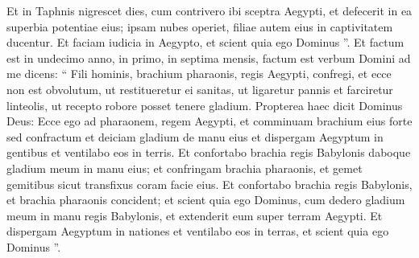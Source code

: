\begin{biblechapter}
\begin{biblechapter}
\begin{biblechapter}
\begin{biblechapter}
\begin{biblechapter}
\begin{biblechapter}
\begin{biblechapter}
\begin{biblechapter}
\begin{biblechapter}
\begin{biblechapter}
\begin{biblechapter}
\begin{biblechapter}
\begin{biblechapter}
\begin{biblechapter}
\begin{biblechapter}
\begin{biblechapter}
\begin{biblechapter}
\begin{biblechapter}
\begin{biblechapter}
\begin{biblechapter}
\begin{biblechapter}
\begin{biblechapter}
\begin{biblechapter}
\begin{biblechapter}
\begin{biblechapter}
\begin{biblechapter}
\begin{biblechapter}
\begin{biblechapter}
\begin{biblechapter}
\begin{biblechapter}
\verse Et in Taphnis nigrescet dies, cum contrivero ibi sceptra Aegypti, et defecerit in ea superbia potentiae eius; ipsam nubes operiet, filiae autem eius in captivitatem ducentur. 
\verse Et faciam iudicia in Aegypto, et scient quia ego Dominus ”.
 \verse Et factum est in undecimo anno, in primo, in septima mensis, factum est verbum Domini ad me dicens: 
\verse “ Fili hominis, brachium pharaonis, regis Aegypti, confregi, et ecce non est obvolutum, ut restitueretur ei sanitas, ut ligaretur pannis et farciretur linteolis, ut recepto robore posset tenere gladium. 
\verse Propterea haec dicit Dominus Deus: Ecce ego ad pharaonem, regem Aegypti, et comminuam brachium eius forte sed confractum et deiciam gladium de manu eius 
\verse et dispergam Aegyptum in gentibus et ventilabo eos in terris. 
 \verse Et confortabo brachia regis Babylonis daboque gladium meum in manu eius; et confringam brachia pharaonis, et gemet gemitibus sicut transfixus coram facie eius. 
\verse Et confortabo brachia regis Babylonis, et brachia pharaonis concident; et scient quia ego Dominus, cum dedero gladium meum in manu regis Babylonis, et extenderit eum super terram Aegypti. 
\verse Et dispergam Aegyptum in nationes et ventilabo eos in terras, et scient quia ego Dominus ”.
 

\end{biblechapter}
\end{biblechapter}
\end{biblechapter}
\end{biblechapter}
\end{biblechapter}
\end{biblechapter}
\end{biblechapter}
\end{biblechapter}
\end{biblechapter}
\end{biblechapter}
\end{biblechapter}
\end{biblechapter}
\end{biblechapter}
\end{biblechapter}
\end{biblechapter}
\end{biblechapter}
\end{biblechapter}
\end{biblechapter}
\end{biblechapter}
\end{biblechapter}
\end{biblechapter}
\end{biblechapter}
\end{biblechapter}
\end{biblechapter}
\end{biblechapter}
\end{biblechapter}
\end{biblechapter}
\end{biblechapter}
\end{biblechapter}
\end{biblechapter}
